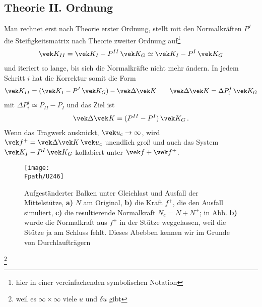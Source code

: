 {{{{{%
\textcolor{blau2}{\section{Theorie II. Ordnung}}
Man rechnet erst nach Theorie erster Ordnung, stellt mit den Normalkr\"{a}ften $P^I$ die Steifigkeitsmatrix nach Theorie zweiter Ordnung auf\footnote{hier in einer vereinfachenden symbolischen Notation}
\begin{align}
\vek K_{II} = \vek K_I - P^{II}\,\vek K_G \simeq \vek K_I - P^I\,\vek K_G
\end{align}
und iteriert so lange, bis sich die Normalkr\"{a}fte nicht mehr \"{a}ndern. In jedem Schritt $i$ hat die Korrektur somit die Form
\begin{align}
\vek K_{II} = (\vek K_I - P^I\,\vek K_G) - \vek \Delta \vek K \qquad \vek \Delta \vek K = \Delta P_i^I\,\vek K_G
\end{align}
mit $\Delta P_i^I \simeq P_{II} - P_I$ und das Ziel ist
\begin{align}
 \vek \Delta \vek K =  (P^{II} - P^I)\,\vek K_G\,.
\end{align}
Wenn das Tragwerk ausknickt, $\vek u_c \to \infty$, wird $\vek f^+ = \vek \Delta \vek K\,\vek u_c$ unendlich gro{\ss} und auch das System $\vek K_I - P^I\,\vek K_G$ kollabiert unter $\vek f + \vek f^+$.

\begin{figure}[tbp]
\centering
\texttt{[image: \\Fpath/U246]}
\caption{Aufgest\"{a}nderter Balken unter Gleichlast und Ausfall der Mittelst\"{u}tze, \textbf{ a)} $N$ am Original, \textbf{ b)} die Kraft $f^+$, die den Ausfall simuliert, \textbf{ c)} die resultierende Normalkraft $N_c = N + N^+ $; in Abb. \textbf{ b)} wurde die Normalkraft aus $f^+$ in der St\"{u}tze weggelassen, weil die St\"{u}tze ja am Schluss fehlt. Dieses Abebben kennen wir im Grunde von Durchlauftr\"{a}gern }
\label{U246}
\end{figure}%

\footnote{weil es $\infty \times \infty$ viele $u$ und $\delta u$ gibt} 

}}}}}
